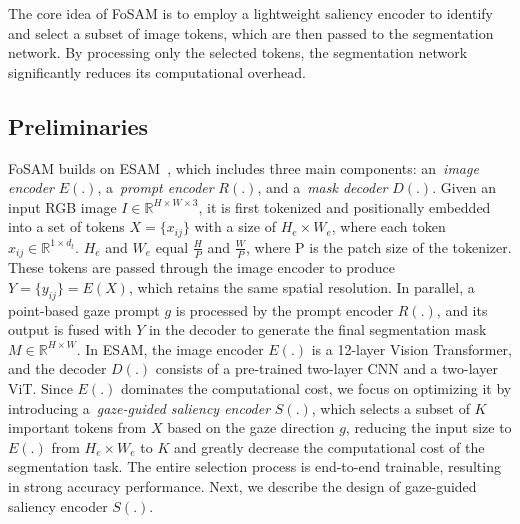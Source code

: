 \documentclass{article}
\begin{document}
The core idea of FoSAM is to employ a lightweight saliency encoder to identify and select a subset of image tokens, which are then passed to the segmentation network. By processing only the selected tokens, the segmentation network significantly reduces its computational overhead.


\subsection{Preliminaries}
\label{sec:Preliminaries}

FoSAM builds on ESAM~\cite{xiong2024efficientsam}, which includes three main components: an~\textit{image encoder} $E(.)$, a~\textit{prompt encoder} $R(.)$, and a~\textit{mask decoder} $D(.)$. Given an input RGB image $I \in \mathbb{R}^{H \times W \times 3}$, it is first tokenized and positionally embedded into a set of tokens $X = \{x_{ij}\}$ with a size of $H_e \times W_e$, where each token $x_{ij} \in \mathbb{R}^{1 \times d_t}$. $H_e$ and $W_{e}$ equal $\frac{H}{P}$ and $\frac{W}{P}$, where P is the patch size of the tokenizer. These tokens are passed through the image encoder to produce $Y=\{y_{ij}\}=E(X)$, which retains the same spatial resolution. In parallel, a point-based gaze prompt $g$ is processed by the prompt encoder $R(.)$, and its output is fused with $Y$ in the decoder to generate the final segmentation mask $M \in \mathbb{R}^{H \times W}$. In ESAM, the image encoder $E(.)$ is a 12-layer Vision Transformer, and the decoder $D(.)$ consists of a pre-trained two-layer CNN and a two-layer ViT. Since $E(.)$ dominates the computational cost, we focus on optimizing it by introducing a~\textit{gaze-guided saliency encoder} $S(.)$, which selects a subset of $K$ important tokens from $X$ based on the gaze direction $g$, reducing the input size to $E(.)$ from $H_e \times W_e$ to $K$ and greatly decrease the computational cost of the segmentation task. The entire selection process is end-to-end trainable, resulting in strong accuracy performance. Next, we describe the design of gaze-guided saliency encoder $S(.)$.
\end{document}
